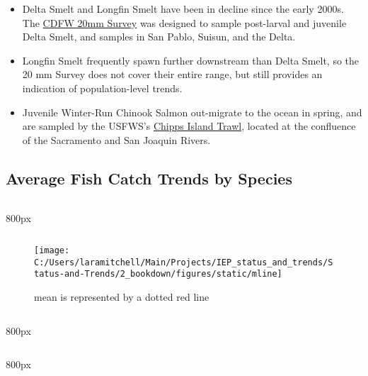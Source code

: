 \documentclass[
]{book}
\providecommand{\tightlist}{%
  \setlength{\itemsep}{0pt}\setlength{\parskip}{0pt}}
\begin{document}
\begin{itemize}
\tightlist
\item
  Delta Smelt and Longfin Smelt have been in decline since the early 2000s. The \href{https://wildlife.ca.gov/Conservation/Delta/20mm-Survey}{CDFW 20mm Survey} was designed to sample post-larval and juvenile Delta Smelt, and samples in San Pablo, Suisun, and the Delta.
\item
  Longfin Smelt frequently spawn further downstream than Delta Smelt, so the 20 mm Survey does not cover their entire range, but still provides an indication of population-level trends.
\item
  Juvenile Winter-Run Chinook Salmon out-migrate to the ocean in spring, and are sampled by the USFWS's \href{https://www.fws.gov/lodi/juvenile_fish_monitoring_program/jfmp_index.htm}{Chipps Island Trawl}, located at the confluence of the Sacramento and San Joaquin Rivers.
\end{itemize}

\hypertarget{average-fish-catch-trends-by-species-1}{%
\subsection{Average Fish Catch Trends by Species}\label{average-fish-catch-trends-by-species-1}}

\begin{columns-nocenter}

\begin{column}{800px\textwidth}
\begin{column}

\begin{figure}
\texttt{[image: C:/Users/laramitchell/Main/Projects/IEP\_status\_and\_trends/Status-and-Trends/2\_bookdown/figures/static/mline]} \caption{mean is represented by a dotted red line}\label{fig:unnamed-chunk-39}
\end{figure}

\end{column}
\end{column}

\begin{column}{800px\textwidth}
\begin{column}

\end{column}
\end{column}

\begin{column}{800px\textwidth}
\begin{column}

\end{column}
\end{column}

\end{columns-nocenter}
\end{document}
